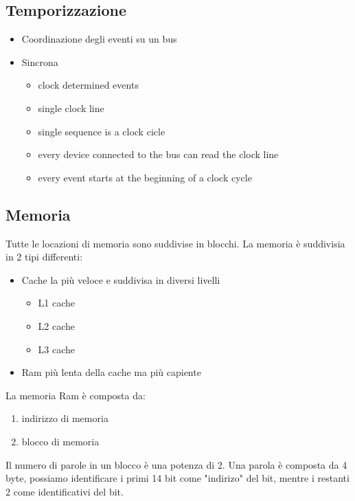 \documentclass[12pt, a4paper]{article}
\begin{document}
\subsection{Temporizzazione}
\begin{itemize}
	\item Coordinazione degli eventi su un bus
	\item Sincrona
	\begin{itemize}
		\item clock determined events
		\item single clock line
		\item single sequence is a clock cicle
		\item every device connected to the bus can read the clock line
		\item every event starts at the beginning of a clock cycle
	\end{itemize}
\end{itemize}

\subsection{Memoria}
Tutte le locazioni di memoria sono suddivise in blocchi. \newline
La memoria è suddivisia in 2 tipi differenti:
\begin{itemize}
	\item Cache la più veloce e suddivisa in diversi livelli
		\begin{itemize}
			\item L1 cache
			\item L2 cache
			\item L3 cache
		\end{itemize}
	\item Ram più lenta della cache ma più capiente
\end{itemize}

La memoria Ram è composta da:
\begin{enumerate}
	\item indirizzo di memoria
	\item blocco di memoria 
\end{enumerate}
Il numero di parole in un blocco è una potenza di 2. \newline
Una parola è composta da 4 byte, possiamo identificare i primi 14 bit come "indirizo" del bit, mentre i restanti 2 come identificativi del bit.
\end{document}

